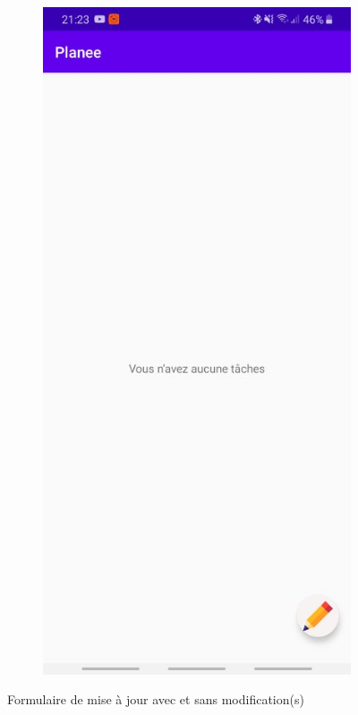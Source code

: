 \documentclass[12pt,a4paper]{report}
\begin{document}
\begin{flushleft}
\begin{figure}[!h]
    \begin{subfigure}[b]{0.3\textwidth}
        \includegraphics[width=\textwidth]{NoTask}
    \end{subfigure}
    \caption{Formulaire de mise à jour avec et sans modification(s)}
\end{figure}
\end{flushleft}
\newpage
\end{document}
